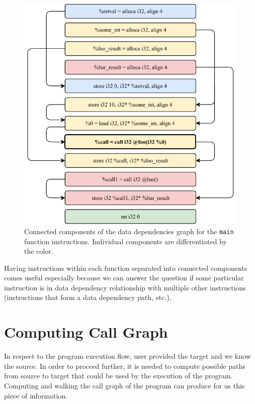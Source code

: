 \documentclass[12pt, twoside]{fithesis2}
\renewcommand{\_}{\leavevmode \kern0.07em\vbox{\hrule width0.4em}}
\begin{document}
\begin{figure}[ht]
    \centering
    \includegraphics[]{images/main_components.pdf}
    \caption{Connected components of the data dependencies graph
    for the \texttt{main} function instructions. Individual components
    are differentiated by the color.}
    \label{fig:connected_components_graph}
\end{figure}

\bigskip

Having instructions within each function separated into connected components
comes useful especially because we can answer the question if some particular
instruction is in data dependency relationship with multiple other instructions
(instructions that form a data dependency path, etc.).

\section{Computing Call Graph}
\label{sec:design-callgraph}


In respect to the program execution flow, user provided the target and we know
the source.
In order to proceed further, it is needed to compute possible paths from
source to target that could be used by the execution of the program.
Computing and walking the call graph of the program can produce for us this
piece of information.
\end{document}
